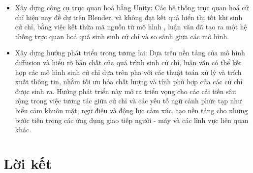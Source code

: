 \begin{itemize}
	\item Xây dựng công cụ trực quan hoá bằng Unity: Các hệ thống trực quan hoá cử chỉ hiện nay đề dự trên Blender, và không đạt kết quả hiển thị tốt khi sinh cử chỉ, bằng việc kết thừa mã nguồn từ mô hình \cite{starke2022deepphase}, luận văn đã tạo ra một hệ thống trực quan hoá quá sinh sinh cử chỉ và so sánh giữa các mô hình. 
	
	\item Xây dựng hướng phát triển trong tương lai: Dựa trên nền tảng của mô hình diffusion và hiểu rõ bản chất của quá trình sinh cử chỉ, luận văn có thể kết hợp các mô hình sinh cử chỉ dựa trên pha với các thuật toán xử lý và trích xuất thông tin, nhằm tối ưu hóa chất lượng và tính phù hợp của các cử chỉ được sinh ra. Hướng phát triển này mở ra triển vọng cho các cải tiến sâu rộng trong việc tương tác giữa cử chỉ và các yếu tố ngữ cảnh phức tạp như biểu cảm khuôn mặt, ngữ điệu và động lực cảm xúc, tạo nền tảng cho những bước tiến trong các ứng dụng giao tiếp người - máy và các lĩnh vực liên quan khác.
\end{itemize}








\section{Lời kết}




